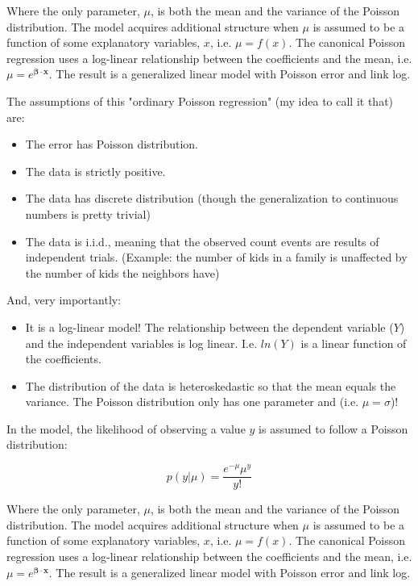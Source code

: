 Where the only parameter, $\mu$, is both the mean and the variance of the Poisson distribution. The model acquires additional structure when $\mu$ is assumed to be a function of some explanatory variables, $x$, i.e. $\mu = f(x)$. The canonical Poisson regression uses a log-linear relationship between the coefficients and the mean, i.e. $\mu = e^{\mathbf{\beta \cdot x}}$. The result is a generalized linear model with Poisson error and link log.

The assumptions of this "ordinary Poisson regression" (my idea to call it that) are: 
\begin{itemize}
\item The error has Poisson distribution.
\item The data is strictly positive.
\item The data has discrete distribution (though the generalization to continuous numbers is pretty trivial)
\item The data is i.i.d., meaning that the observed count events are results of independent trials. (Example: the number of kids in a family is unaffected by the number of kids the neighbors have)
\end{itemize}

And, very importantly:
\begin{itemize}
\item It is a log-linear model! The relationship between the dependent variable ($Y$) and the independent variables is log linear. I.e. $ln(Y)$ is a linear function of the coefficients.
\item The distribution of the data is heteroskedastic so that the mean equals the variance. The Poisson distribution only has one parameter and (i.e. $\mu = \sigma$)!
\end{itemize}

In the model, the likelihood of observing a value $y$ is assumed to follow a Poisson distribution:

\begin{equation}
p(y|\mu) = \frac{e^{-\mu} \mu^{y}}{y!}
\end{equation}

Where the only parameter, $\mu$, is both the mean and the variance of the Poisson distribution. The model acquires additional structure when $\mu$ is assumed to be a function of some explanatory variables, $x$, i.e. $\mu = f(x)$. The canonical Poisson regression uses a log-linear relationship between the coefficients and the mean, i.e. $\mu = e^{\mathbf{\beta \cdot x}}$. The result is a generalized linear model with Poisson error and link log.

